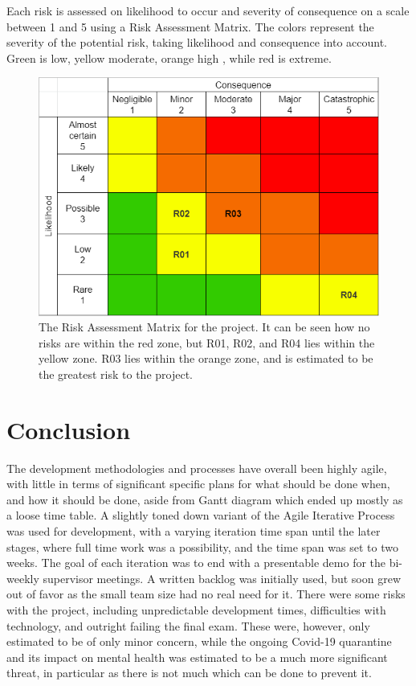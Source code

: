 \newpage
Each risk is assessed on likelihood to occur and severity of consequence on a scale between 1 and 5 using a Risk Assessment Matrix. The colors represent the severity of the potential risk, taking likelihood and consequence into account. Green is low, yellow moderate, orange high , while red is extreme.

\begin{figure}[H]
    \centering
    \includegraphics[scale=0.4]{Pictures/RiskAssesmentMatrix.png}
    \caption{The Risk Assessment Matrix for the project. It can be seen how no risks are within the red zone, but R01, R02, and R04 lies within the yellow zone. R03 lies within the orange zone, and is estimated to be the greatest risk to the project.}
    \label{fig:riskmatrix}
\end{figure}

\section{Conclusion}

The development methodologies and processes have overall been highly agile, with little in terms of significant specific plans for what should be done when, and how it should be done, aside from Gantt diagram which ended up mostly as a loose time table. A slightly toned down variant of the Agile Iterative Process was used for development, with a varying iteration time span until the later stages, where full time work was a possibility, and the time span was set to two weeks. The goal of each iteration was to end with a presentable demo for the bi-weekly supervisor meetings. A written backlog was initially used, but soon grew out of favor as the small team size had no real need for it. There were some risks with the project, including unpredictable development times, difficulties with technology, and outright failing the final exam. These were, however, only estimated to be of only minor concern, while the ongoing Covid-19 quarantine and its impact on mental health was estimated to be a much more significant threat, in particular as there is not much which can be done to prevent it.